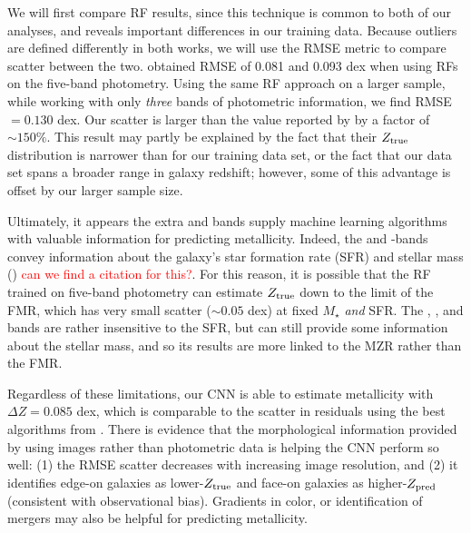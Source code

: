 \documentclass[fleqn,usenatbib]{mnras}
\newcommand{\editorial}[1]{\textcolor{red}{#1}}
\begin{document}
We will first compare RF results, since this technique is common to both of our analyses, and reveals important differences in our training data. Because outliers are defined differently in both works, we will use the RMSE metric to compare scatter between the two. \cite{Acquaviva2016} obtained RMSE of 0.081 and 0.093 dex when using RFs on the five-band photometry. Using the same RF approach on a larger sample, while working with only \textit{three} bands of photometric information, we find RMSE $= 0.130$ dex. Our scatter is larger than the value reported by \cite{Acquaviva2016} by a factor of $\sim 150\%$. This result may partly be explained by the fact that their $Z_{\rm true}$ distribution is narrower than for our training data set, or the fact that our data set spans a broader range in galaxy redshift; however, some of this advantage is offset by our larger sample size.

Ultimately, it appears the extra \sdssu{} and \sdssz{} bands supply machine learning algorithms with valuable information for predicting metallicity. %
Indeed, the \sdssu{} and \sdssz-bands convey information about the galaxy's star formation rate (SFR) and stellar mass (\mstar) \editorial{can we find a citation for this?}. For this reason, it is possible that the RF trained on five-band photometry can estimate $Z_{\rm true}$ down to the limit of the FMR, which has very small scatter ($\sim 0.05$ dex) at fixed $M_{\star}$ \textit{and} SFR. The \sdssg{}, \sdssr{}, and \sdssi{} bands are rather insensitive to the SFR, but can still provide some information about the stellar mass, and so its results are more linked to the MZR rather than the FMR.

Regardless of these limitations, our CNN is able to estimate metallicity with $\Delta Z = 0.085$ dex, which is comparable to the scatter in residuals using the best algorithms from \cite{Acquaviva2016}. There is evidence that the morphological information provided by using images rather than photometric data is helping the CNN perform so well: (1) the RMSE scatter decreases with increasing image resolution, and (2) it identifies edge-on galaxies as lower-$Z_{\rm true}$ and face-on galaxies as higher-$Z_{\rm pred}$ (consistent with observational bias). Gradients in color, or identification of mergers  may also be helpful for predicting metallicity.
\end{document}
